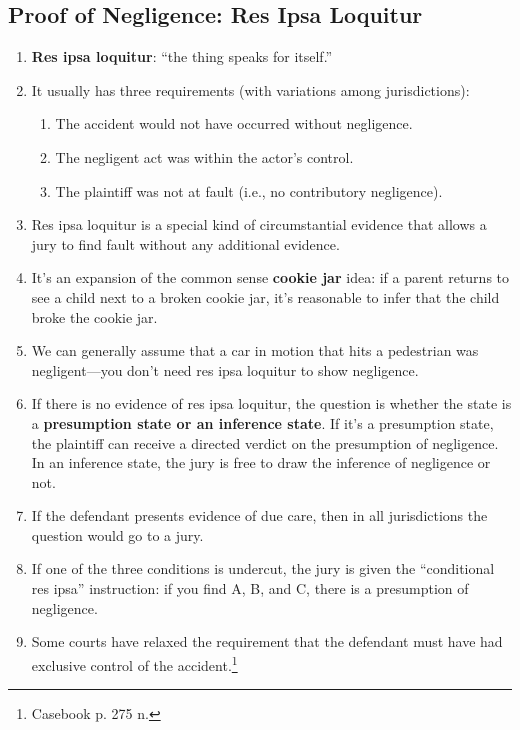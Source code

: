 \subsection{Proof of Negligence: Res Ipsa Loquitur}

\begin{enumerate}
    \item \textbf{Res ipsa loquitur}: ``the thing speaks for itself.''
    \item It usually has three requirements (with variations among 
    jurisdictions):
    \begin{enumerate}
        \item The accident would not have occurred without negligence.
        \item The negligent act was within the actor's control.
        \item The plaintiff was not at fault (i.e., no contributory 
        negligence).
    \end{enumerate}
    \item Res ipsa loquitur is a special kind of circumstantial evidence that 
    allows a jury to find fault without any additional evidence.
    \item It's an expansion of the common sense \textbf{cookie jar} idea: if a 
    parent returns to see a child next to a broken cookie jar, it's reasonable 
    to infer that the child broke the cookie jar.
    \item We can generally assume that a car in motion that hits a pedestrian 
    was negligent---you don't need res ipsa loquitur to show negligence.
    \item If there is no evidence of res ipsa loquitur, the question is 
    whether the state is a \textbf{presumption state or an inference state}. 
    If it's a presumption state, the plaintiff can receive a directed verdict 
    on the presumption of negligence.  In an inference state, the jury is free 
    to draw the inference of negligence or not.
    \item If the defendant presents evidence of due care, then in all 
    jurisdictions the question would go to a jury.
    \item If one of the three conditions is undercut, the jury is given the 
    ``conditional res ipsa'' instruction: if you find A, B, and C, there is a 
    presumption of negligence.
    \item Some courts have relaxed the requirement that the defendant must 
    have had exclusive control of the accident.\footnote{Casebook p. 275 n. 
}
\end{enumerate}
